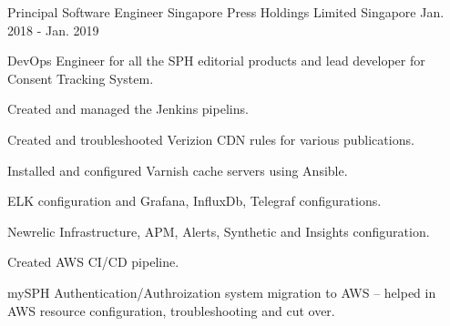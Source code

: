 \begin{cventries}
  \cventry
      {Principal Software Engineer} %
      {Singapore Press Holdings Limited} %
      {Singapore} %
      {Jan. 2018 - Jan. 2019} %
      { %
        \begin{cvitems}
          \item {DevOps Engineer for all the SPH editorial products and lead developer for Consent Tracking System.}
          \item {Created and managed the Jenkins pipelins.}
          \item {Created and troubleshooted Verizion CDN rules for various publications.}
          \item {Installed and configured Varnish cache servers using Ansible.}
          \item {ELK configuration and Grafana, InfluxDb, Telegraf configurations.}
          \item {Newrelic Infrastructure, APM, Alerts, Synthetic and Insights configuration.}
          \item {Created AWS CI/CD pipeline.}
          \item {mySPH Authentication/Authroization system migration to AWS – helped in AWS resource configuration, troubleshooting and cut over.}
        \end{cvitems}
      }



\end{cventries}
